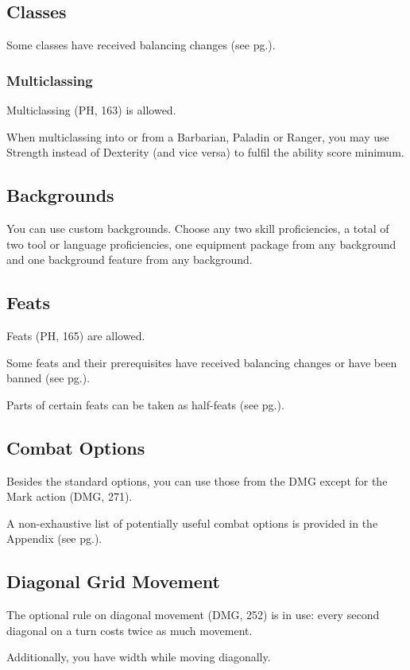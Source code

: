 \documentclass[letterpaper,twocolumn,openany,nodeprecatedcode]{dndbook}
\newcommand{\pg}[1]{pg.\pageref{#1}}
\begin{document}
\subsection{Classes}
Some classes have received balancing changes (see \pg{balance-classes}). 

\subsubsection{Multiclassing}
Multiclassing (PH, 163) is allowed. 

When multiclassing into or from a Barbarian, Paladin or Ranger, you may use Strength instead of Dexterity (and vice versa) to fulfil the ability score minimum. 

\subsection{Backgrounds}
You can use custom backgrounds. Choose any two skill proficiencies, a total of two tool or language proficiencies, one equipment package from any background and one background feature from any background.

\subsection{Feats}
Feats (PH, 165) are allowed. 

Some feats and their prerequisites have received balancing changes or have been banned (see \pg{balance-feats}).

Parts of certain feats can be taken as half-feats (see \pg{balance-feats-subfeats}).

\subsection{Combat Options}
Besides the standard options, you can use those from the DMG except for the Mark action (DMG, 271). 

A non-exhaustive list of potentially useful combat options is provided in the Appendix (see \pg{appendix-combat-options}).


\subsection{Diagonal Grid Movement}
The optional rule on diagonal movement (DMG, 252) is in use: every second diagonal on a turn costs twice as much movement.

Additionally, you have width while moving diagonally. 
\end{document}
